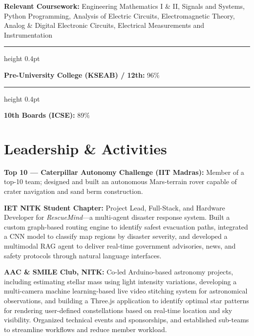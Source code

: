 \documentclass[10.5pt]{article}
\begin{document}
\vspace{6pt}

\vspace{6pt}

\noindent\textbf{\small Relevant Coursework:} {\small Engineering Mathematics I \& II, Signals and Systems, Python Programming, Analysis of Electric Circuits, Electromagnetic Theory, Analog \& Digital Electronic Circuits, Electrical Measurements and Instrumentation}

\vspace{6pt}

{\color{gray!40}\hrule height 0.4pt}

\vspace{6pt}

\noindent\textbf{\small Pre-University College (KSEAB) / 12th:} {\small 96\%}

\vspace{4pt}

{\color{gray!40}\hrule height 0.4pt}

\vspace{6pt}

\noindent\textbf{\small 10th Boards (ICSE):} {\small 89\%}
\section*{Leadership \& Activities}

\noindent\textbf{Top 10 --- Caterpillar Autonomy Challenge (IIT Madras):}
{\small\color{dark} Member of a top-10 team; designed and built an autonomous Mars-terrain rover capable of crater navigation and sand berm construction.}

\vspace{0.4em}
\noindent\textbf{IET NITK Student Chapter:}
{\small\color{dark} Project Lead, Full-Stack, and Hardware Developer for \textit{RescueMind}—a multi-agent disaster response system. Built a custom graph-based routing engine to identify safest evacuation paths, integrated a CNN model to classify map regions by disaster severity, and developed a multimodal RAG agent to deliver real-time government advisories, news, and safety protocols through natural language interfaces.}

\vspace{0.4em}
\noindent\textbf{AAC \& SMILE Club, NITK:}
{\small\color{dark} Co-led Arduino-based astronomy projects, including estimating stellar mass using light intensity variations, developing a multi-camera machine learning-based live video stitching system for astronomical observations, and building a Three.js application to identify optimal star patterns for rendering user-defined constellations based on real-time location and sky visibility. Organized technical events and sponsorships, and established sub-teams to streamline workflows and reduce member workload.}
\end{document}
